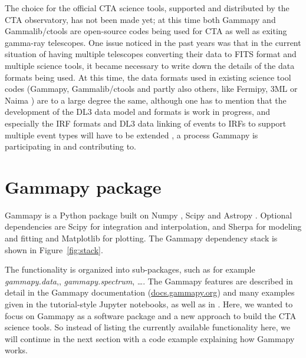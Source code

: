 \documentclass{PoS}
\newcommand{\urlGammapyDocs}{\href{http://docs.gammapy.org}{docs.gammapy.org}}
\begin{document}
The choice for the official CTA science tools, supported and distributed by the
CTA observatory, has not been made yet; at this time both Gammapy and
Gammalib/ctools are open-source codes being used for CTA as well as exiting
gamma-ray telescopes. One issue noticed in the past years was that in the
current situation of having multiple telescopes converting their data to FITS
format and multiple science tools, it became necessary to write down the details
of the data formats being used. At this time, the data formats used in existing
science tool codes (Gammapy, Gammalib/ctools and partly also others, like
Fermipy, 3ML \cite{3ml} or Naima \cite{naima}) are to a large degree the same,
although one has to mention that the development of the DL3 data model and
formats is work in progress, and especially the IRF formats and DL3 data linking
of events to IRFs to support multiple event types will have to be extended
\cite{opendata}, a process Gammapy is participating in and contributing to.

\section{Gammapy package}
\label{sec:package}

Gammapy is a Python package built on Numpy \cite{numpy}, Scipy \cite{scipy} and
Astropy \cite{astropy}. Optional dependencies are Scipy for integration and
interpolation, and Sherpa \cite{sherpa2001, sherpa2009, sherpa2011} for modeling
and fitting and Matplotlib \cite{matplotlib} for plotting. The Gammapy
dependency stack is shown in Figure~\ref{fig:stack}.

The functionality is organized into sub-packages, such as for example {\it
gammapy.data},, {\it gammapy.spectrum}, \ldots . The
Gammapy features are described in detail in the Gamma\-py documentation
(\urlGammapyDocs) and many examples given in the tutorial-style Jupyter
notebooks, as well as in \cite{gammapy-icrc2015}. Here, we wanted to focus on
Gammapy as a software package and a new approach to build the CTA science tools.
So instead of listing the currently available functionality here, we will
continue in the next section with a code example explaining how Gammapy works.

\end{document}
